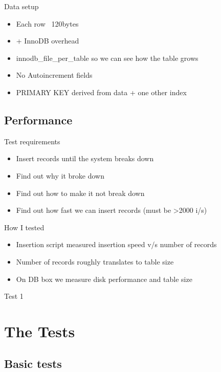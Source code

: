 \documentclass{beamer}
\begin{document}
\begin{frame}{Data setup}
  \begin{itemize}
  \item Each row ~120bytes
  \item + InnoDB overhead
  \item innodb\_file\_per\_table so we can see how the table grows
  \item No Autoincrement fields
  \item PRIMARY KEY derived from data + one other index
  \end{itemize}
\end{frame}

\subsection{Performance}
\begin{frame}{Test requirements}
  \begin{itemize}
  \item Insert records until the system breaks down
  \item<2-> Find out why it broke down
  \item<3-> Find out how to make it not break down
  \item<4-> Find out how fast we can insert records (must be >2000 i/s)
  \end{itemize}
\end{frame}

\begin{frame}{How I tested}
  \begin{itemize}
  \item Insertion script measured insertion speed v/s number of records
  \item Number of records roughly translates to table size
  \item On DB box we measure disk performance and table size
  \end{itemize}
\end{frame}

\begin{frame}{Test 1}
\end{frame}


\section{The Tests}
\subsection{Basic tests}
\end{document}

